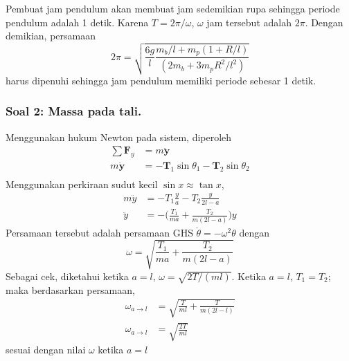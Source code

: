 \documentclass[../main.tex]{subfiles}
\begin{document}
  Pembuat jam pendulum akan membuat jam sedemikian rupa sehingga periode pendulum adalah 1 detik. Karena $T=2\pi/\omega$, $\omega$ jam tersebut adalah $2\pi$. Dengan demikian, persamaan
  \begin{equation*}
    2\pi=\sqrt{\frac{6g}{l}\frac{m_b/l+m_p(1+R/l)}{(2m_b+3m_pR^2/l^2)}}
  \end{equation*}
  harus dipenuhi sehingga jam pendulum memiliki periode sebesar 1 detik.
  
  \subsubsection*{Soal 2: Massa pada tali.} Menggunakan hukum Newton pada sistem, diperoleh
  \begin{align*}
    \sum \mathbf{F}_y&=m\boldsymbol{\ddot{y}}\\
    m\boldsymbol{\ddot{y}}&=-\mathbf{T}_1\sin\theta_1-\mathbf{T}_2\sin\theta_2\\
  \end{align*}
  Menggunakan perkiraan sudut kecil $\sin x\approx\tan x$,
  \begin{align*}
    m\ddot{y}&=-{T}_1\frac{y}{a}-{T}_2\frac{y}{2l-a}\\
    \ddot{y}&=-\biggl(\frac{{T}_1}{ma}+\frac{{T}_2}{m(2l-a)}\biggr)y
  \end{align*}
  Persamaan tersebut adalah persamaan GHS $\ddot{\theta}=-\omega^2\theta$ dengan 
  \begin{equation*}
    \omega=\sqrt{\frac{{T}_1}{ma}+\frac{{T}_2}{m(2l-a)}}
  \end{equation*}
  Sebagai cek, diketahui ketika $a=l$, $\omega=\sqrt{2T/(ml)}$. Ketika $a=l$, $T_1=T_2$; maka berdasarkan persamaan,
  \begin{align*}
    \omega_{a\rightarrow l}&=\sqrt{\frac{{T}}{ml}+\frac{{T}}{m(2l-l)}}\\
    \omega_{a\rightarrow l}&=\sqrt{\frac{2T}{ml}}
  \end{align*}
  sesuai dengan nilai $\omega$ ketika $a=l$
\end{document}
